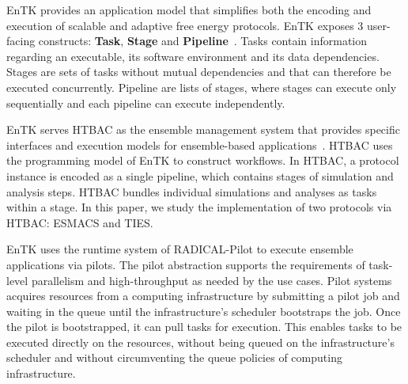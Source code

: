 EnTK provides an application model that simplifies both the encoding and
execution of scalable and adaptive free energy protocols. EnTK exposes 3
user-facing constructs: \textbf{Task}, \textbf{Stage} and
\textbf{Pipeline}~\cite{power-of-many17}. Tasks contain information regarding
an executable, its software environment and its data dependencies. Stages are
sets of tasks without mutual dependencies and that can therefore be executed
concurrently. Pipeline are lists of stages, where stages can execute only
sequentially and each pipeline can execute independently.

EnTK serves HTBAC as the ensemble management system that provides specific
interfaces and execution models for ensemble-based
applications~\cite{power-of-many17}. HTBAC uses the programming model of EnTK
to construct workflows. In HTBAC, a protocol instance is encoded as a single
pipeline, which contains stages of simulation and analysis steps. HTBAC
bundles individual simulations and analyses as tasks within a stage. In this
paper, we study the implementation of two protocols via HTBAC: ESMACS and
TIES.

EnTK uses the runtime system of RADICAL-Pilot to execute ensemble
applications via pilots. The pilot abstraction supports the requirements of
task-level parallelism and high-throughput as needed by the use cases. Pilot
systems acquires resources from a computing infrastructure by submitting a
pilot job and waiting in the queue until the infrastructure's scheduler
bootstraps the job. Once the pilot is bootstrapped, it can pull tasks for
execution. This enables tasks to be executed directly on the resources,
without being queued on the infrastructure's scheduler and without
circumventing the queue policies of computing infrastructure.





